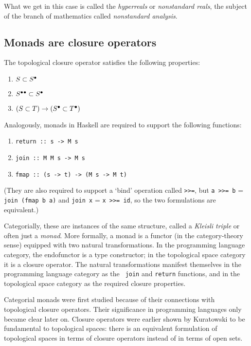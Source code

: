 \documentclass{article}
\def\clos#1{\smash{#1}^\bullet\vphantom{#1}}
\def\closclos#1{\clos{\clos{#1}}}
\def\bind{{\tt >>=}}            %
\begin{document}
What we get in this case is called the {\em hyperreals\/} or {\em
  nonstandard reals\/}, the subject of the branch of mathematics
called {\em nonstandard analysis\/}.  

\subsection*{Monads are closure operators}

The topological closure operator satisfies the following properties:

\begin{enumerate}
  \item $S\subset\clos S$
  \item $\closclos S\subset \clos S$
  \item $(S\subset T) \rightarrow (\clos S\subset\clos T)$
\end{enumerate}

Analogously, monads in Haskell are required to support the following
functions:

\begin{enumerate}
  \item {\tt return :: s -> M s }
  \item {\tt join :: M M s -> M s }
  \item {\tt fmap :: (s -> t) -> (M s -> M t)}
\end{enumerate}

(They are also required to support a `bind' operation called
\bind, but {\tt a~\bind~b} = {\tt join (fmap b a)} and {\tt join~x} =
{\tt  x \bind\ id}, so the two formulations
are equivalent.)  

Categorially, these are instances of the same structure, called a {\em
  Kleisli triple\/} or often just a {\em monad\/}.  More formally, a
monad is a functor (in the category-theory sense) equipped with
two natural transformations.  In the programming language category,
the endofunctor is a type constructor; in the topological space
category it is a closure operator.  The natural transformations
manifest themselves in the programming language category as the {\tt
  join} and {\tt return} functions, and in the topological space
category as the required closure properties.

Categorial monads were first studied because of their connections with
topological closure operators.  Their significance in programming
languages only became clear later on.  Closure operators were earlier
shown by Kuratowski to be fundamental to topological spaces: there is
an equivalent formulation of topological spaces in terms of closure
operators instead of in terms of open sets.
\end{document}
